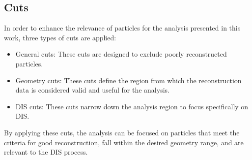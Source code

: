 \subsection{Cuts}
\label{ssec::cuts}
    In order to enhance the relevance of particles for the analysis presented in this work, three types of cuts are applied:
    \begin{itemize}
        \item
            General cuts:
            These cuts are designed to exclude poorly reconstructed particles.
        \item
            Geometry cuts:
            These cuts define the region from which the reconstruction data is considered valid and useful for the analysis.
        \item
            DIS cuts:
            These cuts narrow down the analysis region to focus specifically on DIS.
    \end{itemize}
    By applying these cuts, the analysis can be focused on particles that meet the criteria for good reconstruction, fall within the desired geometry range, and are relevant to the DIS process.

    
    
    
